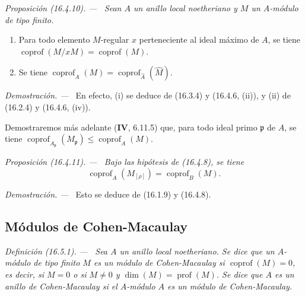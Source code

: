 \documentclass[10pt,oneside]{book}
\makeatletter
\newcommand{\setmanualcurrentlabel}[1]{\def\@currentlabel{#1}}
\newcommand{\oldpage}[2][]{%
  \setcounter{footnote}{0}%
  \marginpar{\scriptsize\textbf{#1}~|~#2}\ignorespaces}
\newenvironment{definition}[1][]{%
  \setmanualcurrentlabel{#1}\par\medskip\noindent\itshape Definición (#1). ---\ }{\par}
\newenvironment{proposition}[1][]{%
  \setmanualcurrentlabel{#1}\par\medskip\noindent\itshape Proposición (#1). ---\ }{\par}
\newenvironment{proof}{%
  \par\medskip\noindent\textit{Demostración. ---\ }}{\par}
\makeatother
\begin{document}
\begin{proposition}[16.4.10]
\label{0.16.4.10-es}
Sean $A$ un anillo local noetheriano y $M$ un $A$-módulo de tipo finito.
\oldpage[0\textsubscript{IV-1}]{36}
\begin{enumerate}
  \item[\textup{(i)}] Para todo elemento $M$-regular $x$ perteneciente al ideal máximo
  de $A$, se tiene
  $\operatorname{coprof}(M/xM)=\operatorname{coprof}(M)$.
  \item[\textup{(ii)}] Se tiene
  $\operatorname{coprof}_A(M)=\operatorname{coprof}_{\widehat A}(\widehat M)$.
\end{enumerate}
\end{proposition}

\begin{proof}
En efecto, (i) se deduce de (16.3.4) y (16.4.6, (ii)), y (ii) de (16.2.4) y
(16.4.6, (iv)).
\end{proof}

Demostraremos más adelante (\textbf{IV}, 6.11.5) que, para todo ideal primo
$\mathfrak{p}$ de $A$, se tiene
$\operatorname{coprof}_{A_{\mathfrak{p}}}(M_{\mathfrak{p}})
\leq\operatorname{coprof}_A(M)$.

\begin{proposition}[16.4.11]
\label{0.16.4.11-es}
Bajo las hipótesis de \textup{(16.4.8)}, se tiene
\begin{equation}
\label{0.16.4.11.1-es}
\tag{16.4.11.1}
  \operatorname{coprof}_A(M_{[\rho]})=\operatorname{coprof}_B(M).
\end{equation}
\end{proposition}

\begin{proof}
Esto se deduce de (16.1.9) y (16.4.8).
\end{proof}

\subsection{Módulos de Cohen-Macaulay}
\label{subsection:0.16.5-es}

\begin{definition}[16.5.1]
\label{0.16.5.1-es}
Sea $A$ un anillo local noetheriano. Se dice que un $A$-módulo de tipo finito
$M$ es un módulo de Cohen-Macaulay si
$\operatorname{coprof}(M)=0$, es decir, si $M=0$ o si $M\neq0$ y
$\dim(M)=\operatorname{prof}(M)$. Se dice que $A$ es un
anillo de Cohen-Macaulay si el $A$-módulo $A$ es un módulo de
Cohen-Macaulay.
\end{definition}
\end{document}
